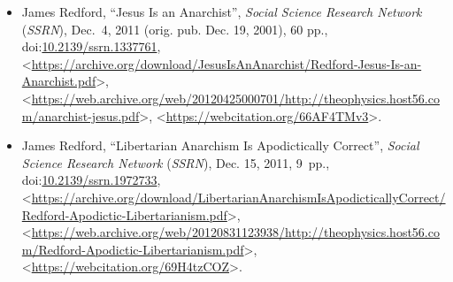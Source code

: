 \documentclass[letterpaper,12pt]{article}
\newcommand{\dsc}{\discretionary{}{}{}}
\begin{document}
\begin{itemize}
\item James Redford, ``Jesus Is an Anarchist'', \emph{Social Science Research Network} (\emph{SSRN}), Dec.~4, 2011 (orig. pub. Dec. 19, 2001), 60 pp., doi:\discretionary{}{}{}\href{https://dx.doi.org/10.2139/ssrn.1337761}{10\dsc .2139/\dsc ssrn\dsc .1337761}, \textless\href{https://archive.org/download/JesusIsAnAnarchist/Redford-Jesus-Is-an-Anarchist.pdf}{\textsf{https\dsc :\dsc //\dsc archive\dsc .org/\dsc download/\dsc Jesus\dsc Is\dsc An\dsc Anarchist/\dsc Redford\dsc -Jesus\dsc -Is\dsc -an\dsc -Anarchist\dsc .pdf}}\textgreater , \textless\href{https://web.archive.org/web/20120425000701/http://theophysics.host56.com/anarchist-jesus.pdf}{\textsf{https\dsc :\dsc //\dsc web\dsc .archive\dsc .org/\dsc web/\dsc 20120425000701/\dsc http\dsc :\dsc //\dsc theophysics\dsc .host56\dsc .com/\dsc anarchist\dsc -jesus\dsc .pdf}}\textgreater , \textless\href{https://webcitation.org/66AF4TMv3}{\textsf{https\dsc :\dsc //\dsc webcitation\dsc .org/\dsc 66AF4TMv3}}\textgreater .

\item James Redford, ``Libertarian Anarchism Is Apodictically Correct'', \emph{Social Science Research Network} (\emph{SSRN}), Dec. 15, 2011, 9~pp., doi:\discretionary{}{}{}\href{https://dx.doi.org/10.2139/ssrn.1972733}{10\dsc .2139/\dsc ssrn\dsc .1972733}, \textless\href{https://archive.org/download/LibertarianAnarchismIsApodicticallyCorrect/Redford-Apodictic-Libertarianism.pdf}{\textsf{https\dsc :\dsc //\dsc archive\dsc .org/\dsc download/\dsc Libertarian\dsc Anarchism\dsc Is\dsc Apodictically\dsc Correct/\dsc Redford\dsc -Apodictic\dsc -Libertarianism\dsc .pdf}}\textgreater , \textless\href{https://web.archive.org/web/20120831123938/http://theophysics.host56.com/Redford-Apodictic-Libertarianism.pdf}{\textsf{https\dsc :\dsc //\dsc web\dsc .archive\dsc .org/\dsc web/\dsc 20120831\dsc 123938/\dsc http\dsc :\dsc //\dsc theophysics\dsc .host56\dsc .com/\dsc Redford\dsc -Apodictic\dsc -Libertarianism\dsc .pdf}}\textgreater , \textless\href{https://webcitation.org/69H4tzCOZ}{\textsf{https\dsc :\dsc //\dsc webcitation\dsc .org/\dsc 69H4tzCOZ}}\textgreater .
\end{itemize}
\end{document}
